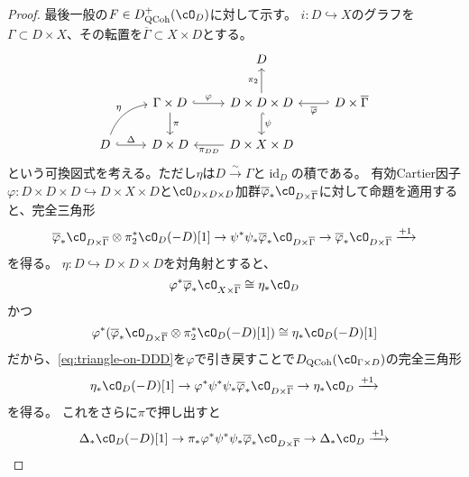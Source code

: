 \documentclass[uplatex, a4paper, dvipdfmx]{jsarticle}
\theoremstyle{definition}
\DeclareMathOperator{\id}{\mathrm{id}}
\DeclareMathOperator{\QCoh}{\mathrm{QCoh}}
\begin{document}
\begin{proof}
    最後一般の$F \in D_{\QCoh}^+(\cO_D)$に対して示す。
    $i \colon D \hookrightarrow X$のグラフを$\Gamma \subset D \times X$、その転置を$\overline{\Gamma} \subset X \times D$とする。
    \[
        \begin{tikzcd}
            && D &\\
            &\Gamma \times D \ar[r, hook, "\varphi"]\ar[d, "\pi"] &D \times D \times D \ar[d, hook, "\psi"] \ar[u, "\pi_2"] & D \times \overline{\Gamma} \ar[l, hook', "\overline{\varphi}"]\\
            D  \ar[r, hook, "\Delta"] \ar[ru, bend left, "\eta"]&D \times D & D \times X \times D \ar[l, "\pi_{DD}"] &
        \end{tikzcd}
    \]
    という可換図式を考える。ただし$\eta$は$D \xrightarrow{\sim} \Gamma$と$\id_D$の積である。
    有効Cartier因子$\varphi \colon D \times D \times D \hookrightarrow D \times X \times D$と$\cO_{D \times D \times D}$加群$\overline{\varphi}_*\cO_{D \times \overline{\Gamma}}$に対して命題を適用すると、完全三角形
    \begin{equation}\label{eq:triangle-on-DDD}
        \overline{\varphi}_* \cO_{D \times \overline{\Gamma}}\otimes \pi_2^*\cO_D(-D)[1]\to \psi^*\psi_*\overline{\varphi}_*\cO_{D \times \overline{\Gamma}}\to \overline{\varphi}_*\cO_{D \times \overline{\Gamma}} \xrightarrow{+1}
    \end{equation}
    を得る。
    $\eta \colon D \hookrightarrow D \times D \times D$を対角射とすると、
    \begin{equation}
        \varphi^*\overline{\varphi}_*\cO_{X \times \overline{\Gamma}} \cong \eta_*\cO_D
    \end{equation}
    かつ
    \begin{equation}
        \varphi^*(\overline{\varphi}_* \cO_{D \times \overline{\Gamma}}\otimes \pi_2^*\cO_D(-D)[1]) \cong \eta_*\cO_D(-D)[1]
    \end{equation}
    だから、\eqref{eq:triangle-on-DDD}を$\varphi$で引き戻すことで$D_{\QCoh}(\cO_{\Gamma \times D})$の完全三角形
    \begin{equation}
        \eta_*\cO_D(-D)[1] \to \varphi^*\psi^*\psi_*\overline{\varphi}_*\cO_{D \times \overline{\Gamma}} \to \eta_*\cO_D \xrightarrow{+1}
    \end{equation}
    を得る。
    これをさらに$\pi$で押し出すと
    \begin{equation}
        \Delta_*\cO_D(-D)[1] \to \pi_*\varphi^*\psi^*\psi_*\overline{\varphi}_*\cO_{D \times \overline{\Gamma}} \to \Delta_*\cO_D \xrightarrow{+1}
    \end{equation}

\end{proof}
\end{document}
